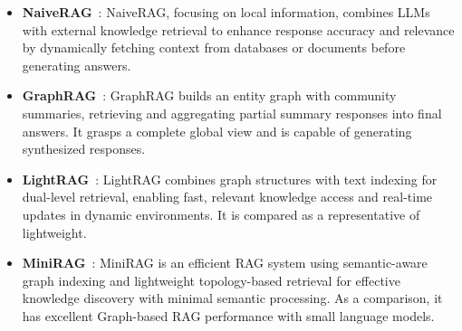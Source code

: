 \documentclass[11pt]{article}
\begin{document}
\begin{itemize}
    \item \textbf{NaiveRAG}~\cite{lewis2020retrieval}: NaiveRAG, focusing on local information, combines LLMs with external knowledge retrieval to enhance response accuracy and relevance by dynamically fetching context from databases or documents before generating answers.
    \item \textbf{GraphRAG}~\cite{edge2024local}: GraphRAG builds an entity graph with community summaries, retrieving and aggregating partial summary responses into final answers. It grasps a complete global view and is capable of generating synthesized responses.
    \item \textbf{LightRAG}~\cite{guo2024lightrag}: LightRAG combines graph structures with text indexing for dual-level retrieval, enabling fast, relevant knowledge access and real-time updates in dynamic environments. It is compared as a representative of lightweight.
    \item \textbf{MiniRAG}~\cite{fan2025minirag}: MiniRAG is an efficient RAG system using semantic-aware graph indexing and lightweight topology-based retrieval for effective knowledge discovery with minimal semantic processing. As a comparison, it has excellent Graph-based RAG performance with small language models.
\end{itemize}
\end{document}
